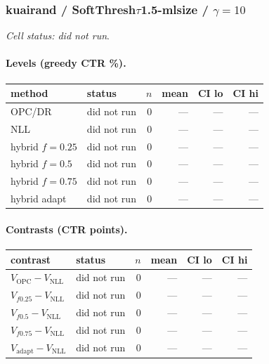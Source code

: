 \documentclass[10pt,a4paper]{article}
\begin{document}
\subsubsection{kuairand / SoftThresh$\tau$1.5-mlsize / $\gamma=10$}
\emph{Cell status: did not run}.
\paragraph{Levels (greedy CTR \%).}
{\centering\small\begin{tabular}{llrrrr}
\toprule method & status & $n$ & mean & CI lo & CI hi \\
\midrule
OPC/DR & did not run & 0 & --- & --- & --- \\
NLL & did not run & 0 & --- & --- & --- \\
hybrid $f{=}0.25$ & did not run & 0 & --- & --- & --- \\
hybrid $f{=}0.5$ & did not run & 0 & --- & --- & --- \\
hybrid $f{=}0.75$ & did not run & 0 & --- & --- & --- \\
hybrid adapt & did not run & 0 & --- & --- & --- \\
\bottomrule\end{tabular}\par}
\paragraph{Contrasts (CTR points).}
{\centering\small\begin{tabular}{llrrrr}
\toprule contrast & status & $n$ & mean & CI lo & CI hi \\
\midrule
$V_{\mathrm{OPC}}-V_{\mathrm{NLL}}$ & did not run & 0 & --- & --- & --- \\
$V_{f0.25}-V_{\mathrm{NLL}}$ & did not run & 0 & --- & --- & --- \\
$V_{f0.5}-V_{\mathrm{NLL}}$ & did not run & 0 & --- & --- & --- \\
$V_{f0.75}-V_{\mathrm{NLL}}$ & did not run & 0 & --- & --- & --- \\
$V_{\mathrm{adapt}}-V_{\mathrm{NLL}}$ & did not run & 0 & --- & --- & --- \\
\bottomrule\end{tabular}\par}
\end{document}

